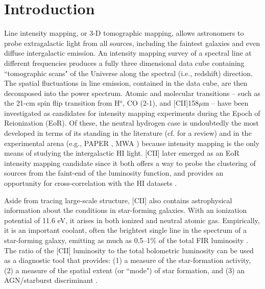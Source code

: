 \documentclass[iop,twocolappendix]{emulateapj}
\begin{document}
\section{Introduction}

Line intensity mapping, or 3-D tomographic mapping, allows astronomers to probe extragalactic light from all sources, including the faintest galaxies and even diffuse intergalactic emission. An intensity mapping survey of a spectral line at different frequencies produces a fully three dimensional data cube containing ``tomographic scans" of the Universe along the spectral (i.e., redshift) direction. The spatial fluctuations in line emission, contained in the data cube, are then decomposed into the power spectrum. Atomic \citep{gongcii,visbal11} and molecular \citep{lidz11,gong11co} transitions -- such as the 21-cm spin flip transition from H$^{\mathrm{o}}$, CO (2-1), and [CII]158$\mu$m -- have been investigated as candidates for intensity mapping experiments during the Epoch of Reionization (EoR). Of these, the neutral hydrogen case is undoubtedly the most developed in terms of its standing in the literature (cf. \citet{morales10rev} for a review) and in the experimental arena (e.g., PAPER \citep{parsons14}, MWA \citep{tingay13}) because intensity mapping is the only means of studying the intergalactic HI light. [CII] later emerged as an EoR intensity mapping candidate since it both offers a way to probe the clustering of sources from the faint-end of the luminosity function, and provides an opportunity for cross-correlation with the HI datasets \citep{gongcii}.

Aside from tracing large-scale structure, [CII] also contains astrophysical information about the conditions in star-forming galaxies. With an ionization potential of 11.6 eV, it arises in both ionized and neutral atomic gas.  Empirically, it is an important coolant, often the brightest single line in the spectrum of a star-forming galaxy, emitting as much as 0.5--1\% of the total FIR luminosity \citep{malhotra97,luhman98,stacey10,graciacarpio11}.   The ratio of the [CII] luminosity to the total bolometric luminosity can be used as a diagnostic tool that provides: (1) a measure of the star-formation activity, (2) a measure of the spatial extent (or ``mode") of star formation, and (3) an AGN/starburst discriminant \citep{hailey-dunsheath10,stacey10,graciacarpio11,sargsyan12,diaz-santos13}.
\end{document}
